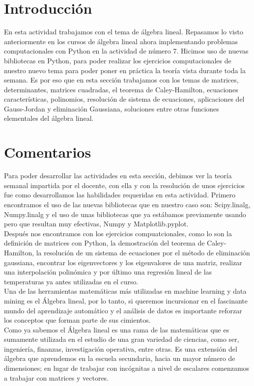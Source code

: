 \documentclass[12pt]{article}
\begin{document}
\section{Introducción}
 En esta actividad trabajamos con el tema de álgebra lineal. Repasamos lo visto anteriormente en los cursos de álgebra lineal ahora implementando problemas computacionales con Python en la actividad de número 7. Hicimos uso de nuevas bibliotecas en Python, para poder realizar los ejercicios computacionales de nuestro nuevo tema para poder poner en práctica la teoría vista durante toda la semana. Es por eso que en esta sección trabajamos con los temas de matrices, determinantes, matrices cuadradas, el teorema de Caley-Hamilton, ecuaciones características, polinomios, resolución de sistema de ecuaciones, aplicaciones del Gauss-Jordan y eliminación Gaussiana, soluciones entre otras funciones elementales del álgebra lineal. 




\section{Comentarios}

Para poder desarrollar las actividades en esta sección, debimos ver la teoría semanal impartida por el docente, con ella y con la resolución de unos ejercicios fue como desarrollamos las habilidades requeridas en esta actividad. Primero encontramos el uso de las nuevas bibliotecas que en nuestro caso son: Scipy.linalg, Numpy.linalg  y el uso de unas bibliotecas que ya estábamos previamente usando pero que resultan muy efectivas, Numpy y Matplotlib.pyplot.\\
Después nos encontramos con los ejercicios compuatcionales, como lo son la definición de matrices con Python, la demostración del teorema de Caley-Hamilton, la resolución de un sistema de ecuaciones por el método de eliminación gaussiana, encontrar los eigenvectores y los eigenvalores de una matriz, realizar una interpolación polinómica y por último una regresión lineal de las temperaturas ya antes utilizadas en el curso.\\
Una de las herramientas matemáticas más utilizadas en machine learning y data mining es el Álgebra lineal, por lo tanto, si queremos incursionar en el fascinante mundo del aprendizaje automático y el análisis de datos es importante reforzar los conceptos que forman parte de sus cimientos.\\
Como ya sabemos el Álgebra lineal es una rama de las matemáticas que es sumamente utilizada en el estudio de una gran variedad de ciencias, como ser, ingeniería, finanzas, investigación operativa, entre otras. Es una extensión del álgebra que aprendemos en la escuela secundaria, hacia un mayor número de dimensiones; en lugar de trabajar con incógnitas a nivel de escalares comenzamos a trabajar con matrices y vectores.\\
\end{document}
